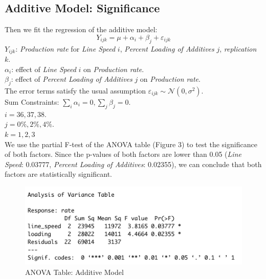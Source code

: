 \documentclass[11pt,a4paper]{article}
\begin{document}
\subsection{Additive Model: Significance}
Then we fit the regression of the additive model:
$$Y_{ijk}=\mu+\alpha_i+\beta_j+\varepsilon_{ijk}$$
$Y_{ijk}$: \textit{Production rate} for \textit{Line Speed} $i$, \textit{Percent Loading of Additives} $j$, \textit{replication} $k$.\\
$\alpha_i$: effect of \textit{Line Speed} $i$ on \textit{Production rate}.\\
$\beta_j$: effect of \textit{Percent Loading of Additives} $j$ on \textit{Production rate}.\\
The error terms satisfy the usual assumption $\varepsilon_{i j k} \sim \mathcal{N}\left(0, \sigma^{2}\right)$.\\
Sum Constraints: $\sum_{i} \alpha_{i}=0, \sum_{j} \beta_{j}=0$.\\
$i=36,37,38.$\\
$j=0\%,2\%,4\%.$\\
$k=1,2,3$\\

We use the partial F-test of the ANOVA table (Figure 3) to test the significance of both factors. Since the p-values of both factors are lower than 0.05 (\textit{Line Speed}: 0.03777, \textit{Percent Loading of Additives}: 0.02355), we can conclude that both factors are statistically significant.
\begin{figure}[htb]
    \centering
    \includegraphics[scale=0.8]{add1.png}
    \caption{ANOVA Table: Additive Model}
    \label{}
\end{figure}
\end{document}
